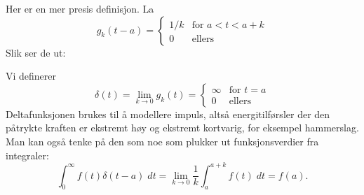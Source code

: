 \documentclass[a4paper,norsk,11pt]{interaktiv}
\begin{document}
Her er en mer presis definisjon. La 
\begin{equation*}
g_k(t-a)=    
\begin{cases}
      1/k  & \text{for } a < t < a + k \\
      0 & \text{ellers} 
    \end{cases} 
\end{equation*}
Slik ser de ut:
 \begin{center}
  \end{center}
Vi definerer
\begin{equation*}
\delta(t)=\lim_{k \to 0} g_k(t)=\begin{cases}
      \infty  & \text{for } t = a  \\
      0 & \text{ellers} 
    \end{cases} 
\end{equation*}
Deltafunksjonen brukes til å modellere impuls, 
altså energitilførsler der den påtrykte kraften er ekstremt høy
og ekstremt kortvarig, for eksempel hammerslag. 
Man kan også tenke på den som noe som plukker ut funksjonsverdier fra integraler:
\begin{equation*}
\int_0^{\infty} f(t)\delta(t-a)\; dt=\lim_{k \to 0}\frac{1}{k}\int_a^{a+k} f(t)\; dt=f(a).
\end{equation*}
\end{document}

